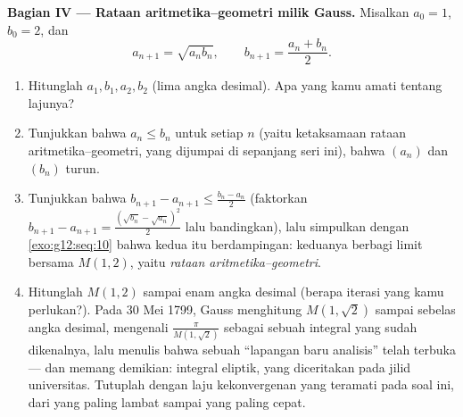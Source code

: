 \begin{problem}
\medskip
\noindent\textbf{Bagian IV --- Rataan aritmetika--geometri milik
Gauss.}
Misalkan $a_0 = 1$, $b_0 = 2$, dan
\[
a_{n+1} = \sqrt{a_n b_n},
\qquad
b_{n+1} = \frac{a_n + b_n}{2} .
\]
\begin{enumerate}[resume]
  \item Hitunglah $a_1, b_1, a_2, b_2$ (lima angka desimal). Apa yang
        kamu amati tentang lajunya?
  \item Tunjukkan bahwa $a_n \leq b_n$ untuk setiap $n$ (yaitu
        ketaksamaan rataan aritmetika--geometri, yang dijumpai di sepanjang
        seri ini), bahwa $(a_n)$  dan $(b_n)$ turun.
  \item Tunjukkan bahwa
        $b_{n+1} - a_{n+1} \leq \frac{b_n - a_n}{2}$
        (faktorkan $b_{n+1} - a_{n+1} =
        \frac{(\sqrt{b_n} - \sqrt{a_n})^2}{2}$ lalu bandingkan),
        lalu simpulkan dengan \cref{exo:g12:seq:10} bahwa kedua
         itu berdampingan: keduanya berbagi limit bersama
        $M(1, 2)$, yaitu \emph{rataan aritmetika--geometri}.
  \item Hitunglah $M(1, 2)$ sampai enam angka desimal (berapa iterasi
        yang kamu perlukan?). Pada 30 Mei 1799, Gauss menghitung
        $M(1, \sqrt2)$ sampai sebelas angka desimal, mengenali
        $\frac{\pi}{M(1,\sqrt2)}$ sebagai sebuah integral yang sudah
        dikenalnya, lalu menulis bahwa sebuah ``lapangan baru analisis''
        telah terbuka --- dan memang demikian: integral eliptik, yang
        diceritakan pada jilid universitas. Tutuplah dengan laju
        kekonvergenan yang teramati pada soal ini, dari yang paling lambat
        sampai yang paling cepat.

\end{enumerate}
\end{problem}
